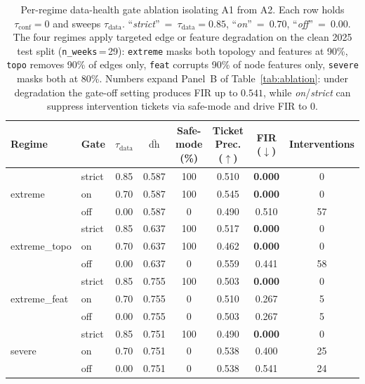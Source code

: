 \begin{table}[!htbp]
\centering
\footnotesize
\setlength{\tabcolsep}{4pt}
\caption{Per-regime data-health gate ablation isolating A1 from A2.
Each row holds $\tau_{\mathrm{conf}}{=}0$ and sweeps $\tau_{\mathrm{data}}$.
``\textit{strict}''~=~$\tau_{\mathrm{data}}{=}0.85$, ``\textit{on}''~=~$0.70$,
``\textit{off}''~=~$0.00$. The four regimes apply targeted edge or feature
degradation on the clean 2025 test split (\texttt{n\_weeks}\,=\,29):
\texttt{extreme} masks both topology and features at 90\%, \texttt{topo}
removes 90\% of edges only, \texttt{feat} corrupts 90\% of node features
only, \texttt{severe} masks both at 80\%. Numbers expand Panel~B of
Table~\ref{tab:ablation}: under degradation the gate-off setting produces
FIR up to $0.541$, while \textit{on}/\textit{strict} can suppress
intervention tickets via safe-mode and drive FIR to $0$.}
\label{tab:a1_isolated}
\begin{tabular}{l l c c c c c c}
\toprule
Regime & Gate & $\tau_{\mathrm{data}}$ & $\overline{\mathrm{dh}}$ & Safe-mode (\%) & Ticket Prec. ($\uparrow$) & FIR ($\downarrow$) & Interventions \\
\midrule
\multirow{3}{*}{extreme}
& strict & 0.85 & 0.587 & 100 & 0.510 & \textbf{0.000} & 0 \\
& on     & 0.70 & 0.587 & 100 & 0.545 & \textbf{0.000} & 0 \\
& off    & 0.00 & 0.587 & 0   & 0.490 & 0.510          & 57 \\
\midrule
\multirow{3}{*}{extreme\_topo}
& strict & 0.85 & 0.637 & 100 & 0.517 & \textbf{0.000} & 0 \\
& on     & 0.70 & 0.637 & 100 & 0.462 & \textbf{0.000} & 0 \\
& off    & 0.00 & 0.637 & 0   & 0.559 & 0.441          & 58 \\
\midrule
\multirow{3}{*}{extreme\_feat}
& strict & 0.85 & 0.755 & 100 & 0.503 & \textbf{0.000} & 0 \\
& on     & 0.70 & 0.755 & 0   & 0.510 & 0.267          & 5 \\
& off    & 0.00 & 0.755 & 0   & 0.503 & 0.267          & 5 \\
\midrule
\multirow{3}{*}{severe}
& strict & 0.85 & 0.751 & 100 & 0.490 & \textbf{0.000} & 0 \\
& on     & 0.70 & 0.751 & 0   & 0.538 & 0.400          & 25 \\
& off    & 0.00 & 0.751 & 0   & 0.538 & 0.541          & 24 \\
\bottomrule
\end{tabular}
\end{table}

